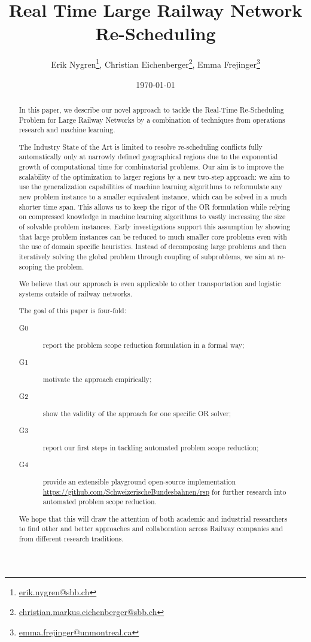 \documentclass{article}
\title{Real Time Large Railway Network Re-Scheduling}
\author{Erik Nygren\footnote{\url{erik.nygren@sbb.ch}}, Christian Eichenberger\footnote{\url{christian.markus.eichenberger@sbb.ch}}, Emma Frejinger\footnote{\url{emma.frejinger@unmontreal.ca}}}
\date{\today}
\begin{document}
\maketitle

\tableofcontents
\newpage
\begin{abstract}
In this paper, we describe our novel approach to tackle the Real-Time Re-Scheduling Problem for Large Railway Networks by a combination of techniques from operations research and machine learning.

The Industry State of the Art is limited to resolve re-scheduling conflicts fully automatically only at narrowly defined geographical regions due to the exponential growth of computational time for combinatorial problems. Our aim is to improve the scalability of the optimization to larger regions by a new two-step approach: we aim to use the generalization capabilities of machine learning algorithms to reformulate any new problem instance to a smaller equivalent instance, which can be solved in a much shorter time span.
This allows us to keep the rigor of the OR formulation while relying on compressed knowledge in machine learning algorithms to vastly increasing the size of solvable problem instances.
Early investigations support this assumption by showing that large problem instances can be reduced to much smaller core problems even with the use of domain specific heuristics.
Instead of decomposing large problems and then iteratively solving the global problem through coupling of subproblems, we aim at re-scoping the problem.

We believe that our approach is even applicable to other transportation and logistic systems outside of railway networks.

The goal of this paper is four-fold:
\begin{description}
\item[G0] report the problem scope reduction formulation in a formal way;
\item[G1] motivate the approach empirically;
\item[G2] show the validity of the approach for one specific OR solver;
\item[G3] report our first steps in tackling automated problem scope reduction;
\item[G4] provide an extensible playground open-source implementation \url{https://github.com/SchweizerischeBundesbahnen/rsp} for further research into automated problem scope reduction.
\end{description}
 We hope that this will draw the attention of both academic and industrial researchers to find other and better approaches and collaboration across Railway companies and from different research traditions.
\end{abstract}
\end{document}
